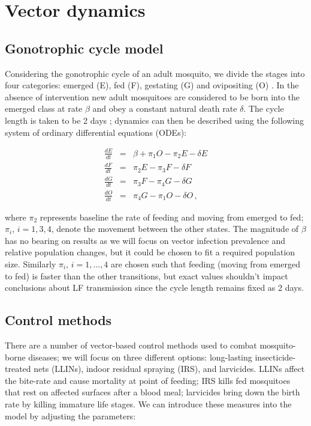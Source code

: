 

\section{Vector dynamics}

\subsection{Gonotrophic cycle model}

Considering the gonotrophic cycle of an adult mosquito, we divide the stages into four categories: emerged (E), fed (F), gestating (G) and ovipositing (O) \cite{killeen2016}. In the absence of intervention new adult mosquitoes are considered to be born into the emerged class at rate $\beta$ and obey a constant natural death rate $\delta$. The cycle length is taken to be 2 days \cite{killeen2016}; dynamics can then be described using the following system of ordinary differential equations (ODEs):


\begin{eqnarray}
\frac{dE}{dt} &=& \beta + \pi_1O - \pi_2E -\delta E \\
\frac{dF}{dt} &=& \pi_2E - \pi_3 F - \delta F \\
\frac{dG}{dt} &=& \pi_3F - \pi_4G - \delta G \\
\frac{dO}{dt} &=& \pi_4G - \pi_1O - \delta O \,,
\end{eqnarray}

where $\pi_2$ represents baseline the rate of feeding and moving from emerged to fed; $\pi_i$, $i=1,3,4$, denote the movement between the other states. The magnitude of $\beta$ has no bearing on results as we will focus on vector infection prevalence and relative population changes, but it could be chosen to fit a required population size. Similarly $\pi_i$, $i=1,\dots,4$ are chosen such that feeding (moving from emerged to fed) is faster than the other transitions, but exact values shouldn't impact conclusions about LF transmission since the cycle length remains fixed as 2 days.

\subsection{Control methods}

There are a number of vector-based control methods used to combat mosquito-borne diseases; we will focus on three different options: long-lasting insecticide-treated nets (LLINs), indoor residual spraying (IRS), and larvicides. LLINs affect the bite-rate and cause mortality at point of feeding; IRS kills fed mosquitoes that rest on affected surfaces after a blood meal; larvicides bring down the birth rate by killing immature life stages. We can introduce these measures into the model by adjusting the parameters:

